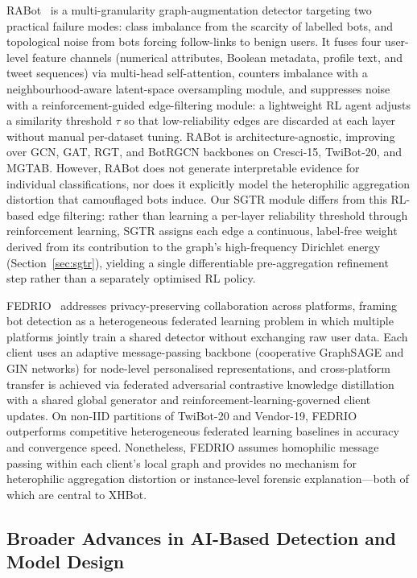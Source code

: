 RABot~\cite{zhang2026rabot} is a multi-granularity graph-augmentation detector targeting two practical failure modes: class imbalance from the scarcity of labelled bots, and topological noise from bots forcing follow-links to benign users. It fuses four user-level feature channels (numerical attributes, Boolean metadata, profile text, and tweet sequences) via multi-head self-attention, counters imbalance with a neighbourhood-aware latent-space oversampling module, and suppresses noise with a reinforcement-guided edge-filtering module: a lightweight RL agent adjusts a similarity threshold $\tau$ so that low-reliability edges are discarded at each layer without manual per-dataset tuning. RABot is architecture-agnostic, improving over GCN, GAT, RGT, and BotRGCN backbones on Cresci-15, TwiBot-20, and MGTAB. However, RABot does not generate interpretable evidence for individual classifications, nor does it explicitly model the heterophilic aggregation distortion that camouflaged bots induce. Our SGTR module differs from this RL-based edge filtering: rather than learning a per-layer reliability threshold through reinforcement learning, SGTR assigns each edge a continuous, label-free weight derived from its contribution to the graph's high-frequency Dirichlet energy (Section~\ref{sec:sgtr}), yielding a single differentiable pre-aggregation refinement step rather than a separately optimised RL policy.

FEDRIO~\cite{yang2026fedrio} addresses privacy-preserving collaboration across platforms, framing bot detection as a heterogeneous federated learning problem in which multiple platforms jointly train a shared detector without exchanging raw user data. Each client uses an adaptive message-passing backbone (cooperative GraphSAGE and GIN networks) for node-level personalised representations, and cross-platform transfer is achieved via federated adversarial contrastive knowledge distillation with a shared global generator and reinforcement-learning-governed client updates. On non-IID partitions of TwiBot-20 and Vendor-19, FEDRIO outperforms competitive heterogeneous federated learning baselines in accuracy and convergence speed. Nonetheless, FEDRIO assumes homophilic message passing within each client's local graph and provides no mechanism for heterophilic aggregation distortion or instance-level forensic explanation---both of which are central to XHBot.

\subsection{Broader Advances in AI-Based Detection and Model Design}

